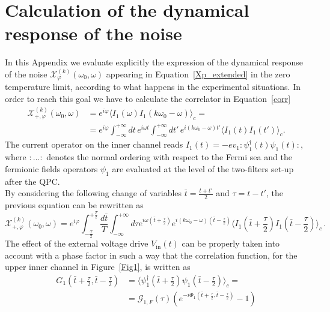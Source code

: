 \documentclass[12pt]{iopart}
\begin{document}
\section{Calculation of the dynamical response of the noise}
\label{appendixA}
In this Appendix we evaluate explicitly the expression of the dynamical response of the noise $\mathcal{X}_\varphi^{(k)}(\omega_0,\omega)$ appearing in Equation~\eqref{Xp_extended} in the zero temperature limit, according to what happens in the experimental situations. In order to reach this goal we have to calculate the correlator in Equation~\eqref{corr}
\begin{equation}
    \begin{split}
    \mathcal{X}_{+,\varphi}^{(k)}(\omega_0,\omega)&=e^{i\varphi}\langle I_1(\omega)I_1(k\omega_0-\omega) \rangle_c= \\
    &=e^{i\varphi}\int_{-\infty}^{+\infty} dt\, e^{i\omega t} \int_{-\infty}^{+\infty} dt'\,e^{i(k\omega_0-\omega)t'} \langle I_1(t)I_1(t') \rangle_c.
    \end{split}
\end{equation}
The current operator on the inner channel reads $I_1(t)=-ev_1 :\psi_1^\dagger(t)\psi_1(t):$, where $:...:$ denotes the normal ordering with respect to the Fermi sea and the fermionic fields operators $\psi_{1}$ are evaluated at the level of the two-filters set-up after the QPC.\\
By considering the following change of variables $\bar{t}=\frac{t+t'}{2}$ and $\tau=t-t'$, the previous equation can be rewritten as
\begin{equation}
    \mathcal{X}_{+,\varphi}^{(k)}(\omega_0,\omega)=e^{i\varphi}\int_{-\frac{T}{2}}^{+\frac{T}{2}} \frac{d\bar{t}}{T} \int_{-\infty}^{+\infty} d\tau e^{i\omega(\bar{t}+\frac{\tau}{2})}e^{i(k\omega_0-\omega)(\bar{t}-\frac{\tau}{2})} \langle I_1(\bar{t}+\frac{\tau}{2})I_1(\bar{t}-\frac{\tau}{2})\rangle_c \,.
    \label{a2}
\end{equation}
The effect of the external voltage drive $V_{\mathrm{in}}(t)$ can be properly taken into account with a phase factor in such a way that the correlation function, for the upper inner channel in Figure~\ref{Fig1}, is written as~\cite{Grenier13}
\begin{equation}
\begin{split}
    G_1(\bar{t}+\frac{\tau}{2},\bar{t}-\frac{\tau}{2})&=\langle \psi_1^\dagger(\bar{t}+\frac{\tau}{2})\psi_1(\bar{t}-\frac{\tau}{2})\rangle_c=
    \\&=\mathcal{G}_{1,F}(\tau)(e^{-i\Phi_{1}(\bar{t}+\frac{\tau}{2},\bar{t}-\frac{\tau}{2})}-1)
    \label{newcorr1}
    \end{split}
\end{equation}
\end{document}
